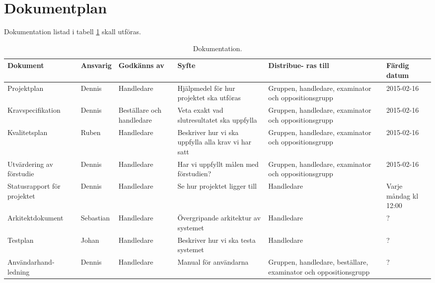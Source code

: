 \section{Dokumentplan}
Dokumentation listad i tabell \ref{dokumentation:tabell} skall utföras.

\begin{table}[H]
	\centering
		\begin{tabularx}{\textwidth}{| p{25mm} | l | X | p{25mm} | X | X |}
			\hline
			\textbf{Dokument} & \textbf{Ansvarig} & \textbf{Godkänns av} & \textbf{Syfte} & \textbf{Distribue-
  ras till} & \textbf{Färdig datum} \\\hline

    		
			{Projektplan} & {Dennis} & {Handledare} & {Hjälpmedel för hur projektet ska utföras} & {Gruppen, handledare, examinator och oppositionsgrupp} & {2015-02-16} \\\hline
			
			{Kravspecifikation} & {Dennis} & {Beställare och handledare} & {Veta exakt vad slutresultatet ska uppfylla} & {Gruppen, handledare, examinator och oppositionsgrupp} & {2015-02-16} \\\hline
			
			{Kvalitetsplan} & {Ruben} & {Handledare} & {Beskriver hur vi ska uppfylla alla krav vi har satt} & {Gruppen, handledare, examinator och oppositionsgrupp} & {2015-02-16} \\\hline
			
						{Utvärdering av förstudie} & {Dennis} & {Handledare} & {Har vi uppfyllt målen med förstudien?} & {Gruppen, handledare, examinator och oppositionsgrupp} & {2015-02-16} \\\hline
			
			{Statusrapport för projektet} & {Dennis} & {Handledare} & {Se hur projektet ligger till} & {Handledare} & {Varje måndag kl 12:00} \\\hline
			
            {Arkitektdokument} & {Sebastian} & {Handledare} & {Övergripande arkitektur av systemet} & {Handledare} & {?} \\\hline
               {Testplan} & {Johan} & {Handledare} & {Beskriver hur vi ska testa systemet} & {Handledare} & {?} \\\hline
			
            {Användarhand-ledning} & {Dennis} & {Handledare} & {Manual för användarna} & {Gruppen, handledare, beställare, examinator och oppositionsgrupp} & {?} \\\hline
            
			
			
		\end{tabularx}
	\caption{Dokumentation.} \label{dokumentation:tabell}
\end{table}
